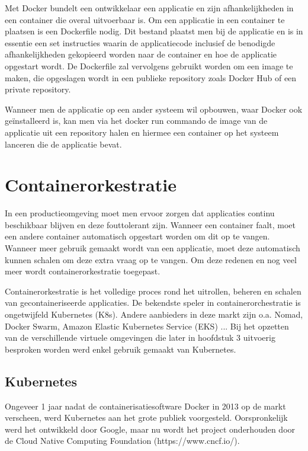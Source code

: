 Met Docker bundelt een ontwikkelaar een applicatie en zijn afhankelijkheden in een container die overal uitvoerbaar is. Om een applicatie in een container te plaatsen is een Dockerfile nodig. 
Dit bestand plaatst men bij de applicatie en is in essentie een set instructies waarin de applicatiecode inclusief de benodigde afhankelijkheden gekopieerd worden naar de container en hoe de applicatie opgestart wordt. De Dockerfile zal vervolgens gebruikt worden om een image te maken, die opgeslagen wordt in een publieke repository zoals Docker Hub of een private repository.

Wanneer men de applicatie op een ander systeem wil opbouwen, waar Docker ook geïnstalleerd is, kan men via het docker run commando de image van de applicatie uit een repository halen en hiermee een container op het systeem lanceren die de applicatie bevat.  

\section{Containerorkestratie}

In een productieomgeving moet men ervoor zorgen dat applicaties continu beschikbaar blijven en deze fouttolerant zijn. Wanneer een container faalt, moet een andere container automatisch opgestart worden om dit op te vangen. Wanneer meer gebruik gemaakt wordt van een applicatie, moet deze automatisch kunnen schalen om deze extra vraag op te vangen. Om deze redenen en nog veel meer wordt containerorkestratie toegepast.

Containerorkestratie is het volledige proces rond het uitrollen, beheren en schalen van gecontaineriseerde applicaties. De bekendste speler in containerorchestratie is ongetwijfeld Kubernetes (K8s). Andere aanbieders in deze markt zijn o.a. Nomad, Docker Swarm, Amazon Elastic Kubernetes Service (EKS) ...
Bij het opzetten van de verschillende virtuele omgevingen die later in hoofdstuk 3 uitvoerig besproken worden werd enkel gebruik gemaakt van Kubernetes.

\subsection{Kubernetes} 

Ongeveer 1 jaar nadat de containerisatiesoftware Docker in 2013 op de markt verscheen, werd Kubernetes aan het grote publiek voorgesteld. Oorspronkelijk werd het ontwikkeld door Google, maar nu wordt het project onderhouden door de Cloud Native Computing Foundation (https://www.cncf.io/).

